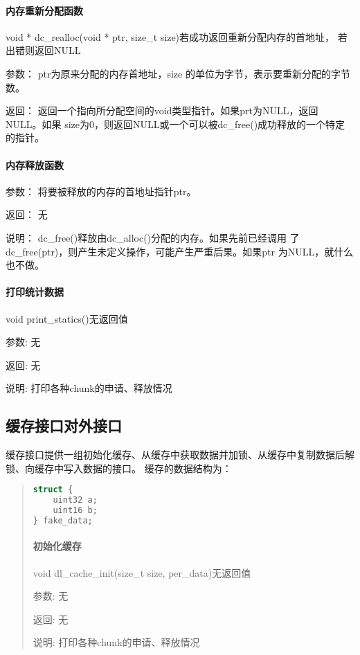 \paragraph{内存重新分配函数}
	{void * dc\_realloc(void * ptr, size\_t size)}{若成功返回重新分配内存的首地址，
	若出错则返回NULL}
	\begin{compactdesc}
	\item[参数：]ptr为原来分配的内存首地址，size 的单位为字节，表示要重新分配的字节数。
	\item[返回：]返回一个指向所分配空间的void类型指针。如果prt为NULL，返回NULL。如果
	size为0，则返回NULL或一个可以被dc\_free()成功释放的一个特定的指针。
	\end{compactdesc}
\paragraph{内存释放函数}
	\begin{compactdesc}
	\item[参数：]将要被释放的内存的首地址指针ptr。
	\item[返回：]无
	\item[说明：]dc\_free()释放由dc\_alloc()分配的内存。如果先前已经调用
		了dc\_free(ptr)，则产生未定义操作，可能产生严重后果。如果ptr
		为NULL，就什么也不做。 
	\end{compactdesc}

\paragraph{打印统计数据}
{void print\_statics()}{无返回值}
	\begin{compactdesc}
	\item[参数:]无
	\item[返回:]无
	\item[说明:]打印各种chunk的申请、释放情况
	\end{compactdesc}

\subsection{缓存接口对外接口}
缓存接口提供一组初始化缓存、从缓存中获取数据并加锁、从缓存中复制数据后解锁、向缓存中写入数据的接口。
缓存的数据结构为：
\begin{quote}
\begin{lstlisting}[language={C}]
struct {
	uint32 a;
	uint16 b;
} fake_data;
\end{lstlisting}
\paragraph{初始化缓存}
{void dl\_cache\_init(size\_t size, per\_data)}{无返回值}
	\begin{compactdesc}
	\item[参数:]无
	\item[返回:]无
	\item[说明:]打印各种chunk的申请、释放情况
	\end{compactdesc}


\end{quote}

%

